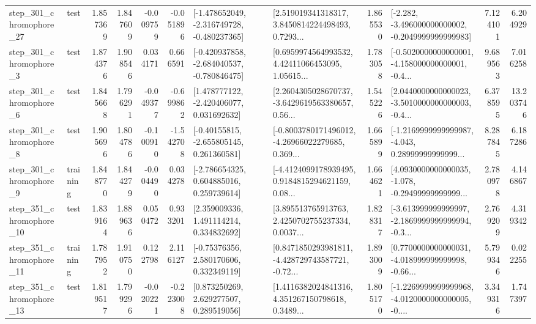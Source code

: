\begin{tabular}{llrrrrllrlrr}
  step\_301\_chromophore\_27 &      test &      1.857369 &    1.847609 &     -0.009759 & -0.051896 &  [-1.478652049, -2.316749728, -0.480237365] &  [2.519019341318317, 3.8450814224498493, 0.7293... &       1.865530 &  [-2.282, -3.496000000000002, -0.2049999999999983] &            7.124101 &          6.204929 \\
   step\_301\_chromophore\_3 &      test &      1.874376 &    1.908546 &      0.034171 &  0.666591 &  [-0.420937858, -2.684040537, -0.780846475] &  [0.6959974564993532, 4.42411066453095, 1.05615... &       1.783058 &  [-0.5020000000000001, -4.158000000000001, -0.4... &            9.689563 &          7.016258 \\
   step\_301\_chromophore\_6 &      test &      1.845668 &    1.796291 &     -0.049377 & -0.699862 &    [1.478777122, -2.420406077, 0.031692632] &  [2.2604305028670737, -3.6429619563380657, 0.56... &       1.545226 &  [2.0440000000000023, -3.5010000000000003, -0.4... &            6.378595 &         13.203746 \\
   step\_301\_chromophore\_8 &      test &      1.905696 &    1.804786 &     -0.100910 & -1.542708 &    [-0.40155815, -2.655805145, 0.261360581] &  [-0.8003780171496012, -4.26966022279685, 0.369... &       1.665899 &  [-1.2169999999999987, -4.043, 0.28999999999999... &            8.287845 &          6.187286 \\
   step\_301\_chromophore\_9 &  training &      1.848770 &    1.844279 &     -0.004490 &  0.034278 &    [-2.786654325, 0.604885016, 0.259739614] &  [-4.4124099178939495, 0.9184815294621159, 0.08... &       1.664621 &  [4.0930000000000035, -1.078, -0.29499999999999... &            2.780978 &          4.146867 \\
  step\_351\_chromophore\_10 &      test &      1.839164 &    1.889636 &      0.050472 &  0.933201 &     [2.359009336, 1.491114214, 0.334832692] &  [3.895513765913763, 2.4250702755237334, 0.0037... &       1.828317 &  [-3.613999999999997, -2.1869999999999994, -0.3... &            2.769209 &          4.319342 \\
  step\_351\_chromophore\_11 &  training &      1.787952 &    1.910750 &      0.122798 &  2.116127 &     [-0.75376356, 2.580170606, 0.332349119] &  [0.8471850293981811, -4.428729743587721, -0.72... &       1.893009 &  [0.7700000000000031, -4.018999999999998, -0.66... &            5.799346 &          0.022255 \\
  step\_351\_chromophore\_13 &      test &      1.819517 &    1.799296 &     -0.020221 & -0.223008 &     [0.873250269, 2.629277507, 0.289519056] &  [1.4116382024841316, 4.351267150798618, 0.3489... &       1.805170 &  [-1.2269999999999968, -4.0120000000000005, -0.... &            3.349316 &          1.747397 \\

\end{tabular}
